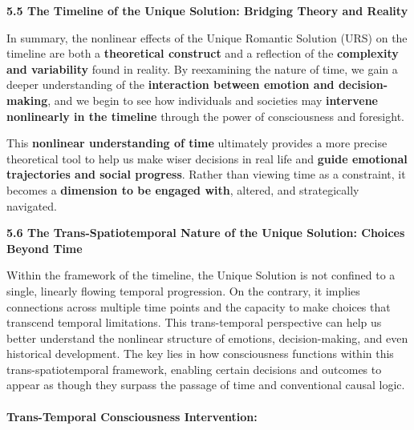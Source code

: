 \documentclass[a4paper]{article}
\begin{document}
\textbf{5.5 The Timeline of the Unique Solution: Bridging Theory and Reality}

In summary, the nonlinear effects of the Unique Romantic Solution (URS) on the timeline are both a \textbf{theoretical
construct} and a reflection of the \textbf{complexity and variability} found in reality. By reexamining the nature of
time, we gain a deeper understanding of the \textbf{interaction between emotion and decision-making}, and we begin to
see how individuals and societies may \textbf{intervene nonlinearly in the timeline} through the power of consciousness
and foresight.

This \textbf{nonlinear understanding of time} ultimately provides a more precise theoretical tool to help us make wiser
decisions in real life and \textbf{guide emotional trajectories and social progress}. Rather than viewing time as a
constraint, it becomes a \textbf{dimension to be engaged with}, altered, and strategically navigated.

\textbf{5.6 The Trans-Spatiotemporal Nature of the Unique Solution: Choices Beyond Time}

Within the framework of the timeline, the Unique Solution is not confined to a single, linearly flowing temporal
progression. On the contrary, it implies connections across multiple time points and the capacity to make choices that
transcend temporal limitations. This trans-temporal perspective can help us better understand the nonlinear structure
of emotions, decision-making, and even historical development. The key lies in how consciousness functions within this
trans-spatiotemporal framework, enabling certain decisions and outcomes to appear as though they surpass the passage of
time and conventional causal logic.

\paragraph[Trans{}-Temporal Consciousness Intervention:]{\textbf{Trans-Temporal Consciousness Intervention:}}
\end{document}
